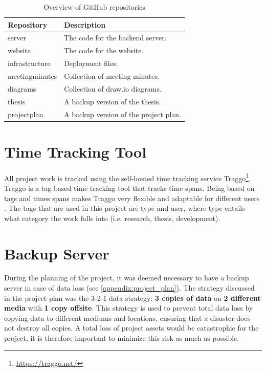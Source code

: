 \begin{table}[h]
    \centering
    \begin{tabular}{l|l}
        \hline
        \textbf{Repository} & \textbf{Description} \\
        \hline
        server & The code for the backend server. \\
        website & The code for the website. \\
        \hline
        infrastructure & Deployment files. \\ 
        meetingminutes & Collection of meeting minutes. \\
        diagrams & Collection of draw.io\tablefootnote{\url{https://www.drawio.com/}} diagrams. \\
        \hline
        thesis & A backup version of the thesis. \\
        projectplan & A backup version of the project plan. \\
        \hline
    \end{tabular}
    \caption[Overview of GitHub repositories]{Overview of GitHub repositories}
    \label{tab:githubrepositories}
\end{table}

\section{Time Tracking Tool}

All project work is tracked using the self-hosted time tracking service Traggo\footnote{\url{https://traggo.net/}}. Traggo is a tag-based time tracking tool that tracks time spans. Being based on tags and times spans makes Traggo very flexible and adaptable for different users \cite{traggonet}. The tags that are used in this project are type and user, where type entails what category the work falls into (i.e. research, thesis, development).

\section{Backup Server}\label{sec:devpro:backupserver}

During the planning of the project, it was deemed necessary to have a backup server in case of data loss (see \autoref{appendix:project_plan}). The strategy discussed in the project plan was the 3-2-1 data strategy: \textbf{3 copies of data} on \textbf{2 different media} with \textbf{1 copy offsite}. This strategy is used to prevent total data loss by copying data to different mediums and locations, ensuring that a disaster does not destroy all copies. A total loss of project assets would be catastrophic for the project, it is therefore important to minimize this risk as much as possible.

